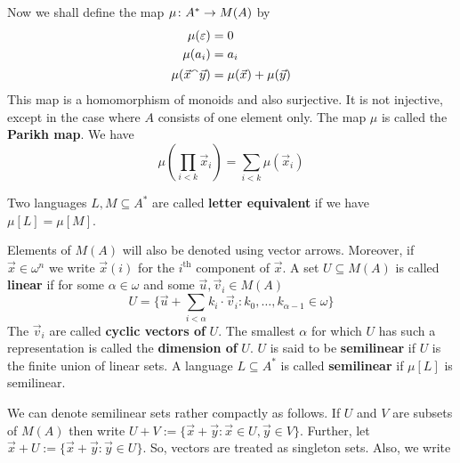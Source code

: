 Now we shall define the map $\mu \colon A^{\ast} \rightarrow M(A)$ by
\index{$\mu$}%
\begin{equation}
\begin{split}
\mu(\varepsilon)   & = 0    \\
\mu(a_i) & = a_i \\
\mu(\vec{x} {^{\smallfrown}} \vec{y}) & = \mu(\vec{x}) + \mu(\vec{y})
\end{split}
\end{equation}
This map is a homomorphism of monoids and also surjective.
It is not injective, except in the case where $A$ consists
of one element only. The map
$\mu$ is called the \textbf{Parikh map}. We have
\begin{equation}
\mu\left(\prod_{i < k} \vec{x}_i\right) =
\sum_{i < k} \mu(\vec{x}_i) 
\end{equation}
\begin{defn}
Two languages $L, M \subseteq A^{\ast}$ are called
\textbf{letter equivalent} if we have $\mu[L] = \mu[M]$.
\end{defn}
\begin{defn}
\label{defn:semi}
Elements of $M(A)$ will also be denoted using vector arrows. Moreover, 
if $\vec{x} \in \omega^n$ we write $\vec{x}(i)$ for the $i^{\text{th}}$ 
component of $\vec{x}$. A set $U \subseteq M(A)$ is called \textbf{linear} 
if for some $\alpha \in \omega$ and some $\vec{u}, \vec{v}_i \in M(A)$
\begin{equation}
U = \{\vec{u} + \sum_{i < \alpha} k_i \cdot \vec{v}_i : k_0, \dotsc, 
    k_{\alpha-1}\in \omega\} 
\end{equation}
The $\vec{v}_i$ are called \textbf{cyclic vectors of} $U$.
The smallest $\alpha$ for which $U$ has such a representation
is called the \textbf{dimension of} $U$.  $U$ is said to be
\textbf{semilinear} if $U$ is the finite union of linear sets.
A language $L \subseteq A^{\ast}$ is called \textbf{semilinear}
if $\mu[L]$ is semilinear.  
\end{defn}
We can denote semilinear sets rather compactly as follows.
If $U$ and $V$ are subsets of $M(A)$ then write
$U + V := \{\vec{x} + \vec{y} : \vec{x} \in U, \vec{y} \in V\}$. 
Further, let $\vec{x} + U := \{\vec{x} + \vec{y} : \vec{y} \in U\}$. 
So, vectors are treated as singleton sets. Also, we write 
